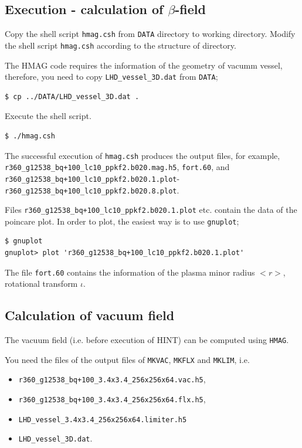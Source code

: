 \documentclass[10pt]{ltxdoc} %
\begin{document}
\subsection{Execution - calculation of $\beta$-field}

Copy the shell script \texttt{hmag.csh} from \texttt{DATA} directory to working directory. 
Modify the shell script \texttt{hmag.csh} according to the structure of directory. 

The HMAG code requires the information of the geometry of vacumm vessel, therefore, you need to copy \texttt{LHD\_vessel\_3D.dat} from \texttt{DATA};
\begin{verbatim}
$ cp ../DATA/LHD_vessel_3D.dat .
\end{verbatim}

Execute the shell script.
\vspace{-2mm}
\begin{verbatim}
$ ./hmag.csh
\end{verbatim}
\vspace{5mm}


The successful execution of \texttt{hmag.csh} produces the output files, for example, \texttt{r360\_g12538\_bq+100\_lc10\_ppkf2.b020.mag.h5}, \texttt{fort.60}, and \texttt{r360\_g12538\_bq+100\_lc10\_ppkf2.b020.1.plot}-\texttt{r360\_g12538\_bq+100\_lc10\_ppkf2.b020.8.plot}. 

Files \texttt{r360\_g12538\_bq+100\_lc10\_ppkf2.b020.1.plot} etc. contain the data of the poincare plot. 
In order to plot, the easiest way is to use \texttt{gnuplot};
\vspace{0mm}
\begin{verbatim}
$ gnuplot
gnuplot> plot 'r360_g12538_bq+100_lc10_ppkf2.b020.1.plot'
\end{verbatim}
\vspace{5mm}

The file \texttt{fort.60} contains the information of the plasma minor radius $<r>$, rotational transform $\iota$. 

\subsection{Calculation of vacuum field}
The vacuum field (i.e. before execution of HINT) can be computed using \texttt{HMAG}. 

You need the files of the output files of \texttt{MKVAC}, \texttt{MKFLX} and \texttt{MKLIM}, i.e.
\begin{itemize}
    \item \texttt{r360\_g12538\_bq+100\_3.4x3.4\_256x256x64.vac.h5}, 
    \item \texttt{r360\_g12538\_bq+100\_3.4x3.4\_256x256x64.flx.h5},
    \item \texttt{LHD\_vessel\_3.4x3.4\_256x256x64.limiter.h5}
    \item \texttt{LHD\_vessel\_3D.dat}.
\end{itemize}
\end{document}
